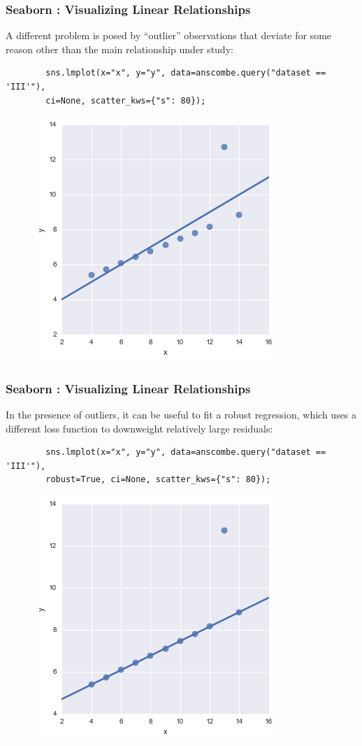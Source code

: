\documentclass{beamer}
\begin{document}
\begin{frame}[fragile]
	\frametitle{Seaborn : Visualizing Linear Relationships}
	\large
	A different problem is posed by “outlier” observations that deviate for some reason other than the main relationship under study:
	\begin{framed}
		\begin{verbatim}
		sns.lmplot(x="x", y="y", data=anscombe.query("dataset == 'III'"),
		ci=None, scatter_kws={"s": 80});
		\end{verbatim}
	\end{framed}
	\begin{figure}
		\centering
		\includegraphics[width=0.55\linewidth]{images/regression_25_0}
	\end{figure}
	
	
\end{frame}
\begin{frame}[fragile]
	\frametitle{Seaborn : Visualizing Linear Relationships}
	\large
	In the presence of outliers, it can be useful to fit a robust regression, which uses a different loss function to downweight relatively large residuals:
	\begin{framed}
		\begin{verbatim}
		sns.lmplot(x="x", y="y", data=anscombe.query("dataset == 'III'"),
		robust=True, ci=None, scatter_kws={"s": 80});
		\end{verbatim}
	\end{framed}
	\begin{figure}
		\centering
		\includegraphics[width=0.55\linewidth]{images/regression_27_0}
		
	\end{figure}
\end{frame}
\end{document}
